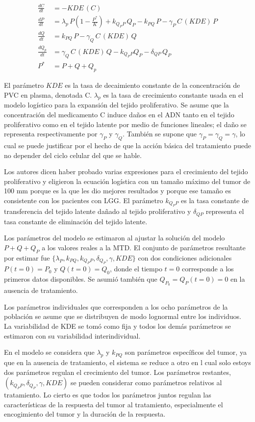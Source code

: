 \documentclass[letterpaper,12pt]{article}
\theoremstyle{definition} \newtheorem{Def}{Definición}[section]
\theoremstyle{definition} \newtheorem{Teo}{Teorema}[section]
\theoremstyle{definition} \newtheorem{Pro}{Proposición}
\theoremstyle{definition} \newtheorem{Lema}{Lema}[section]
\theoremstyle{definition} \newtheorem{Cor}{Corolario}[section]
\begin{document}
\begin{align*}
\frac{dC}{dt}&=-KDE \,(C)\\
\frac{dP}{dt}&=\lambda_p \, P \left ( 1-\frac{P^*}{K}\right) + k_{Q_PP}\,Q_P-k_{PQ}\,P-\gamma_P\, C \, (KDE) \, P\\
\frac{dQ}{dt}&=k_{PQ}\,P-\gamma_Q \,C \, (KDE) \, Q\\
\frac{dQ_p}{dt}&=\gamma_Q \, C \, (KDE) \, Q - k_{Q_PP}Q_P-\delta_{QP}\,Q_P\\
P^*&=P+Q+Q_p
\end{align*} 

El parámetro $KDE$ es la tasa de decaimiento constante de la concentración de PVC en plasma, denotada C. $\lambda_p$ es la tasa de crecimiento constante usada en el modelo logístico para la expansión del tejido proliferativo. Se asume que la concentración del medicamento C induce daños en el ADN tanto en el tejido proliferativo como en el tejido latente por medio de funciones lineales; el daño se representa respectivamente por $\gamma_P$ y $\gamma_Q$. También se supone que $\gamma_P=\gamma_Q=\gamma$, lo cual se puede justificar por el hecho de que la acción básica del tratamiento puede no depender del ciclo celular del que se hable. 

Los autores dicen haber probado varias expresiones para el crecimiento del tejido proliferativo y eligieron la ecuación logística con un tamaño máximo del tumor de 100 mm porque es la que les dio mejores resultados y porque ese tamaño es consistente con los pacientes con LGG. El parámetro $k_{Q_PP}$ es la tasa constante de transferencia del tejido latente dañado al tejido proliferativo y $\delta_{QP}$ representa el tasa constante de eliminación del tejido latente. 

Los parámetros del modelo se estimaron al ajustar la solución del modelo $P+Q+Q_P$ a los valores reales a la MTD. El conjunto de parámetros resultante por estimar fue $\{ \lambda_P,k_{PQ},k_{Q_PP},\delta_{Q_P},\gamma, KDE\}$ con dos condiciones adicionales $P(t=0)=P_0$ y $Q(t=0)=Q_0$, donde el tiempo $t=0$ corresponde a los primeros datos disponibles. Se asumió también que $Q_{P_0}=Q_P(t=0)=0$ en la ausencia de tratamiento. 

Los parámetros individuales que corresponden a los ocho parámetros de la población se asume que se distribuyen de modo lognormal entre los individuos. La variabilidad de KDE se tomó como fija y todos los demás parámetros se estimaron con su variabilidad interindividual.

En el modelo se considera que $\lambda_p$ y $k_{PQ}$ son parámetros específicos del tumor, ya que en la ausencia de tratamiento, el sistema se reduce a otro en l cual solo estoys dos parámetros regulan el crecimiento del tumor. Los parámetros restantes, $(k_{Q_PP},\delta_{Q_P},\gamma, KDE)$ se pueden considerar como parámetros relativos al tratamiento. Lo cierto es que todos los parámetros juntos regulan las características de la respuesta del tumor al tratamiento, especialmente el encogimiento del tumor y la duración de la respuesta.
\end{document}
